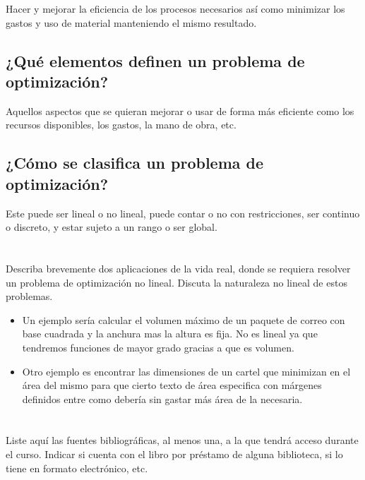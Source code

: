 \documentclass[12pt,oneside]{book}
\begin{document}
Hacer y mejorar la eficiencia de los procesos necesarios así como minimizar los gastos y uso de material manteniendo el mismo resultado. 

\subsection{¿Qué elementos definen un problema de optimización?}

Aquellos aspectos que se quieran mejorar o usar de forma más eficiente como los recursos disponibles, los gastos, la mano de obra, etc. 

\subsection{¿Cómo se clasifica un problema de optimización?}

Este puede ser lineal o no lineal, puede contar o no con restricciones, ser continuo o discreto, y estar sujeto a un rango o ser global.

\newpage 

\section[Ejercicio]{}

{\large Describa brevemente dos aplicaciones de la vida real, donde se requiera
resolver un problema de optimización no lineal. Discuta la naturaleza no
lineal de estos problemas.}

\begin{itemize}
    \item Un ejemplo sería calcular el volumen máximo de un paquete de correo con base cuadrada y la anchura  mas la altura es fija. No es lineal ya que tendremos funciones de mayor grado gracias a que es volumen.
    \item Otro ejemplo es encontrar las dimensiones de un cartel que minimizan en el área del mismo para que cierto texto de área especifica con márgenes definidos entre como debería sin gastar más área de la necesaria.
\end{itemize}

\section[Ejercicio]{}

{\large Liste aquí las fuentes bibliográficas, al menos una, a la que tendrá acceso
durante el curso. Indicar si cuenta con el libro por préstamo de alguna
biblioteca, si lo tiene en formato electrónico, etc.}
\end{document}
